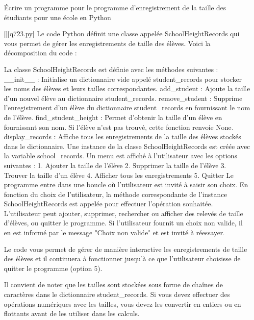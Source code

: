         \question
        Écrire un programme pour le programme d'enregistrement de la taille des étudiants pour une école en Python
        \par
        \begin{solution}
            \renewcommand{\nomfichier}{q723.py}
            \pythonfile{\chemincode \nomfichier}[][\nomfichier]
            Le code Python définit une classe appelée SchoolHeightRecords qui vous permet de gérer les enregistrements de taille des élèves. Voici la décomposition du code :

    La classe SchoolHeightRecords est définie avec les méthodes suivantes :
        \_\_init\_\_ : Initialise un dictionnaire vide appelé student\_records pour stocker les noms des élèves et leurs tailles correspondantes.
        add\_student : Ajoute la taille d'un nouvel élève au dictionnaire student\_records.
        remove\_student : Supprime l'enregistrement d'un élève du dictionnaire student\_records en fournissant le nom de l'élève.
        find\_student\_height : Permet d'obtenir la taille d'un élève en fournissant son nom. Si l'élève n'est pas trouvé, cette fonction renvoie None.
        display\_records : Affiche tous les enregistrements de la taille des élèves stockés dans le dictionnaire.
    Une instance de la classe SchoolHeightRecords est créée avec la variable school\_records.
    Un menu est affiché à l'utilisateur avec les options suivantes :
        1. Ajouter la taille de l'élève
        2. Supprimer la taille de l'élève
        3. Trouver la taille d'un élève
        4. Afficher tous les enregistrements
        5. Quitter
    Le programme entre dans une boucle où l'utilisateur est invité à saisir son choix.
    En fonction du choix de l'utilisateur, la méthode correspondante de l'instance SchoolHeightRecords est appelée pour effectuer l'opération souhaitée. L'utilisateur peut ajouter, supprimer, rechercher ou afficher des relevés de taille d'élèves, ou quitter le programme.
    Si l'utilisateur fournit un choix non valide, il en est informé par le message "Choix non valide" et est invité à réessayer.

Le code vous permet de gérer de manière interactive les enregistrements de taille des élèves et il continuera à fonctionner jusqu'à ce que l'utilisateur choisisse de quitter le programme (option 5).

Il convient de noter que les tailles sont stockées sous forme de chaînes de caractères dans le dictionnaire student\_records. Si vous devez effectuer des opérations numériques avec les tailles, vous devez les convertir en entiers ou en flottants avant de les utiliser dans les calculs.
        \end{solution}
        


